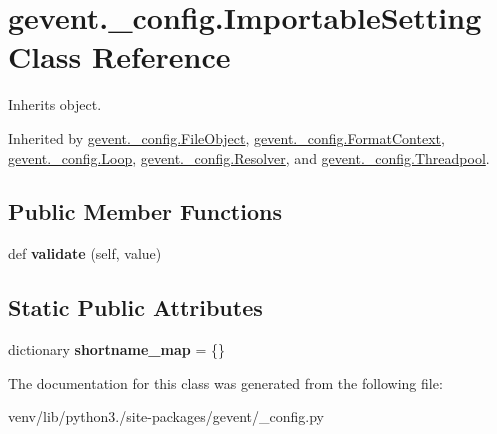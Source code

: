 \hypertarget{classgevent_1_1__config_1_1_importable_setting}{}\section{gevent.\+\_\+config.\+Importable\+Setting Class Reference}
\label{classgevent_1_1__config_1_1_importable_setting}


Inherits object.



Inherited by \hyperlink{classgevent_1_1__config_1_1_file_object}{gevent.\+\_\+config.\+File\+Object}, \hyperlink{classgevent_1_1__config_1_1_format_context}{gevent.\+\_\+config.\+Format\+Context}, \hyperlink{classgevent_1_1__config_1_1_loop}{gevent.\+\_\+config.\+Loop}, \hyperlink{classgevent_1_1__config_1_1_resolver}{gevent.\+\_\+config.\+Resolver}, and \hyperlink{classgevent_1_1__config_1_1_threadpool}{gevent.\+\_\+config.\+Threadpool}.

\subsection*{Public Member Functions}
\begin{DoxyCompactItemize}
\item 
\mbox{\label{classgevent_1_1__config_1_1_importable_setting_aeae545bc4cc89b0bdfe86ce05f83db66}} 
def {\bfseries validate} (self, value)
\end{DoxyCompactItemize}
\subsection*{Static Public Attributes}
\begin{DoxyCompactItemize}
\item 
\mbox{\label{classgevent_1_1__config_1_1_importable_setting_aab8c74108642893f085cf08cc29371c0}} 
dictionary {\bfseries shortname\+\_\+map} = \{\}
\end{DoxyCompactItemize}


The documentation for this class was generated from the following file\+:\begin{DoxyCompactItemize}
\item 
venv/lib/python3./site-\/packages/gevent/\+\_\+config.\+py\end{DoxyCompactItemize}
